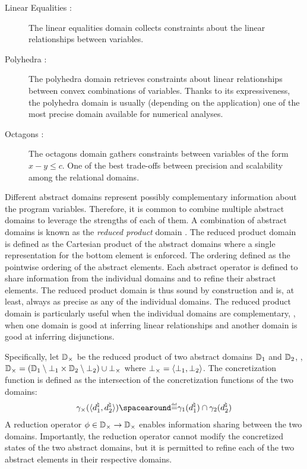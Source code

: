 \begin{description}
  \item[Linear Equalities \cite{Karr1976}:]  The linear equalities domain collects constraints about the linear relationships between variables.
  \item[Polyhedra \cite{Cousot1978}:]  The polyhedra domain retrieves constraints about linear relationships between convex combinations of variables. Thanks to its expressiveness, the polyhedra domain is usually (depending on the application) one of the most precise domain available for numerical analyses.
  \item[Octagons \cite{Min_e2006a}:]  The octagons domain gathers constraints between variables of the form $x - y \le c$. One of the best trade-offs between precision and scalability among the relational domains.
\end{description}

Different abstract domains represent possibly complementary information about the program variables. Therefore, it is common to combine multiple abstract domains to leverage the strengths of each of them. A combination of abstract domains is known as the \emph{reduced product} domain . The reduced product domain is defined as the Cartesian product of the abstract domains where a single representation for the bottom element is enforced.
The ordering defined as the pointwise ordering of the abstract elements.
Each abstract operator is defined to share information from the individual domains and to refine their abstract elements.
The reduced product domain is thus sound by construction and is, at least, always as precise as any of the individual domains. The reduced product domain is particularly useful when the individual domains are complementary, \eg, when one domain is good at inferring linear relationships and another domain is good at inferring disjunctions.

Specifically, let $\mathbb{D}_{\times}$ be the reduced product of two abstract domains $\mathbb{D}_1$ and $\mathbb{D}_2$, \ie, $\mathbb{D}_{\times} = (\mathbb{D}_1 \setminus \bot_1 \times \mathbb{D}_2 \setminus \bot_2) \cup \bot_{\times}$ where $\bot_{\times} = \langle \bot_1, \bot_2 \rangle$.
The concretization function is defined as the intersection of the concretization functions of the two domains:
\begin{align*}
  \productdomainconcretization(\tuple{\defabstractvalue_1}{\defabstractvalue_2}) \DefeQ \abstractdomainconcretization_1(\defabstractvalue_1) \setmeet \abstractdomainconcretization_2(\defabstractvalue_2)
\end{align*}
A reduction operator $\phi\in\mathbb{D}_{\times}\to\mathbb{D}_{\times}$ enables information sharing between the two domains.
Importantly, the reduction operator cannot modify the concretized states of the two abstract domains, but it is permitted to refine each of the two abstract elements in their respective domains.


